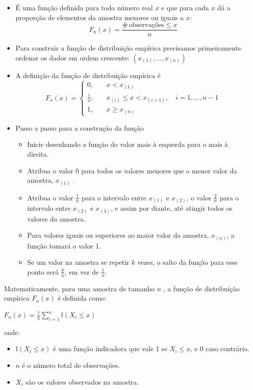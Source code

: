 \documentclass[
]{book}
\providecommand{\tightlist}{%
  \setlength{\itemsep}{0pt}\setlength{\parskip}{0pt}}
\begin{document}
\begin{itemize}
\item
  É uma função definida para todo número real \(x\) e que para cada \(x\)
  dá a proporção de elementos da amostra menores ou iguais a \(x\):
  \[F_{n}(x) = \frac{\# \, \text{observações} \leq x}{n}\]
\item
  Para construir a função de distribuição empírica precisamos
  primeiramente ordenar os dados em ordem crescente:
  \((x_{(1)},\ldots,x_{(n)})\)
\item
  A definição da função de distribuição empírica é
  \[F_{n}(x) = \begin{cases}
    0, & \quad x < x_{(1)} \\
    \frac{i}{n}, & \quad x_{(i)}\leq x < x_{(i+1)}, \quad i=1,\ldots,n-1 \\
    1, & \quad x\geq x_{(n)}
  \end{cases}\]
\item
  Passo a passo para a construção da função

  \begin{itemize}
  \tightlist
  \item
    Inicie desenhando a função do valor mais à esquerda para o mais
    à direita.
  \item
    Atribua o valor 0 para todos os valores menores que o menor
    valor da amostra, \(x_{(1)}\) .
  \item
    Atribua o valor \(\frac{1}{n}\) para o intervalo entre \(x_{(1)}\) e
    \(x_{(2)}\), o valor \(\frac{2}{n}\) para o intervalo entre
    \(x_{(2)}\) e \(x_{(3)}\), e assim por diante, até atingir todos os
    valores da amostra.
  \item
    Para valores iguais ou superiores ao maior valor da amostra,
    \(x_{(n)}\), a função tomará o valor 1.
  \item
    Se um valor na amostra se repetir \(k\) vezes, o salto da função
    para esse ponto será \(\frac{k}{n}\), em vez de \(\frac{1}{n}\).
  \end{itemize}
\end{itemize}

Matematicamente, para uma amostra de tamanho \(n\) , a função de distribuição empírica \(F_n(x)\) é definida como:

\(F_n(x) = \frac{1}{n} \sum_{i=1}^n \mathbb{I}(X_i \leq x)\)

onde:

\begin{itemize}
\tightlist
\item
  \(\mathbb{I}(X_i \leq x)\) é uma função indicadora que vale 1 se \(X_i \leq x\), e 0 caso contrário.
\item
  \(n\) é o número total de observações.
\item
  \(X_i\) são os valores observados na amostra.
\end{itemize}
\end{document}
